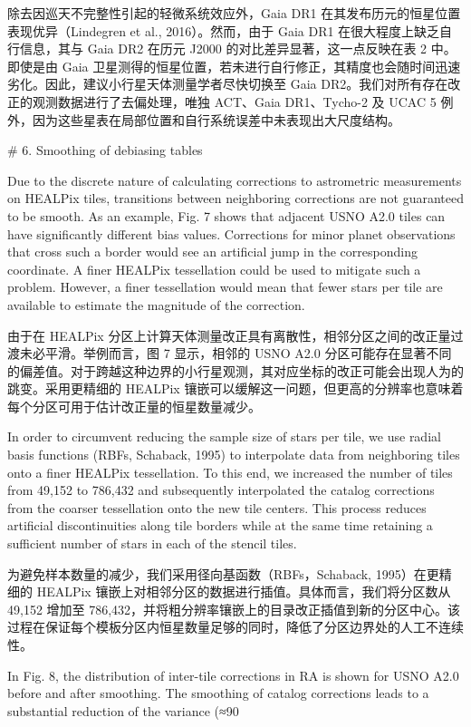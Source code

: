 除去因巡天不完整性引起的轻微系统效应外，Gaia DR1 在其发布历元的恒星位置表现优异（Lindegren et al., 2016）。然而，由于 Gaia DR1 在很大程度上缺乏自行信息，其与 Gaia DR2 在历元 J2000 的对比差异显著，这一点反映在表 2 中。即使是由 Gaia 卫星测得的恒星位置，若未进行自行修正，其精度也会随时间迅速劣化。因此，建议小行星天体测量学者尽快切换至 Gaia DR2。我们对所有存在改正的观测数据进行了去偏处理，唯独 ACT、Gaia DR1、Tycho-2 及 UCAC 5 例外，因为这些星表在局部位置和自行系统误差中未表现出大尺度结构。

# 6. Smoothing of debiasing tables

Due to the discrete nature of calculating corrections to astrometric measurements on HEALPix tiles, transitions between neighboring corrections are not guaranteed to be smooth. As an example, Fig. 7 shows that adjacent USNO A2.0 tiles can have significantly different bias values. Corrections for minor planet observations that cross such a border would see an artificial jump in the corresponding coordinate. A finer HEALPix tessellation could be used to mitigate such a problem. However, a finer tessellation would mean that fewer stars per tile are available to estimate the magnitude of the correction. 

由于在 HEALPix 分区上计算天体测量改正具有离散性，相邻分区之间的改正量过渡未必平滑。举例而言，图 7 显示，相邻的 USNO A2.0 分区可能存在显著不同的偏差值。对于跨越这种边界的小行星观测，其对应坐标的改正可能会出现人为的跳变。采用更精细的 HEALPix 镶嵌可以缓解这一问题，但更高的分辨率也意味着每个分区可用于估计改正量的恒星数量减少。

In order to circumvent reducing the sample size of stars per tile, we use radial basis functions (RBFs, Schaback, 1995) to interpolate data from neighboring tiles onto a finer HEALPix tessellation. To this end, we increased the number of tiles from 49,152 to 786,432 and subsequently interpolated the catalog corrections from the coarser tessellation onto the new tile centers. This process reduces artificial discontinuities along tile borders while at the same time retaining a sufficient number of stars in each of the stencil tiles. 

为避免样本数量的减少，我们采用径向基函数（RBFs，Schaback, 1995）在更精细的 HEALPix 镶嵌上对相邻分区的数据进行插值。具体而言，我们将分区数从 49,152 增加至 786,432，并将粗分辨率镶嵌上的目录改正插值到新的分区中心。该过程在保证每个模板分区内恒星数量足够的同时，降低了分区边界处的人工不连续性。

In Fig. 8, the distribution of inter-tile corrections in RA is shown for USNO A2.0 before and after smoothing. The smoothing of catalog corrections leads to a substantial reduction of the variance (≈90%

